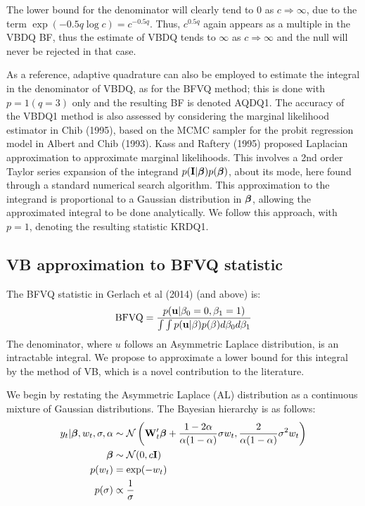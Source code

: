 \documentclass[12pt,epsf]{article}
\newcommand{\utwi}[1]{\mbox{\boldmath $ #1$}}
\begin{document}
The lower bound for the denominator will clearly tend to 0 as $c \Rightarrow \infty$, due to the term $\exp(-0.5q\log c) = c^{-0.5q}$.
Thus, $c^{0.5q}$ again appears as a multiple in the VBDQ BF, thus the estimate of VBDQ tends to $\infty$ as $c \Rightarrow \infty$
and the null will never be rejected in that case.

As a reference, adaptive quadrature can also be employed to estimate the integral in the denominator of VBDQ, as for the BFVQ method; this
is done with $p=1 (q=3)$ only and the resulting BF is denoted AQDQ1. The accuracy of the VBDQ1 method is also assessed by considering the
marginal likelihood estimator in Chib (1995), based on the MCMC sampler for the probit regression model in Albert and Chib (1993). Kass and
Raftery (1995) proposed Laplacian approximation to approximate marginal likelihoods. This
involves a 2nd order Taylor series expansion of the integrand $p({\bf I}|\utwi{\beta}) p(\utwi{\beta})$, about
its mode, here found through a standard numerical search algorithm. This approximation to the integrand is proportional to a
Gaussian distribution in $\utwi{\beta}$, allowing the approximated integral to be done analytically. We follow this approach, with $p=1$,
denoting the resulting statistic KRDQ1.

\subsection{VB approximation to BFVQ statistic}
\label{sec:vb_derivation}
The BFVQ statistic in Gerlach et al (2014) (and above) is:
$$
\mbox{BFVQ} = \frac{ p({\bf u}|\beta_0=0, \beta_1=1)}{ \int \int p({\bf u}|\beta) p(\beta) d \beta_0 d \beta_1 }
$$
The denominator, where $u$ follows an Asymmetric Laplace distribution, is an intractable integral. We propose to approximate a lower bound for this
integral by the method of VB, which is a novel contribution to the literature.

We begin by restating the Asymmetric Laplace (AL) distribution as a continuous mixture of Gaussian distributions.
The Bayesian hierarchy is as follows:
\begin{align}
\nonumber y_t|\bm{\beta},w_t,\sigma,\alpha & \sim {\mathcal{N}}\left(\mathbf{W}_t'\bm{\beta}+\frac{1-2\alpha}{\alpha(1-\alpha)}\sigma w_t,
\frac{2}{\alpha(1-\alpha)}\sigma^2 w_t\right)\\
\nonumber \bm{\beta} &\sim {\mathcal{N}}(0,c \mathbf{I})\\
\nonumber p(w_t)&=\exp(-w_t)\\
p(\sigma)&\propto\frac{1}{\sigma}
\label{eq:BFVQ_hier}
\end{align}
\end{document}

